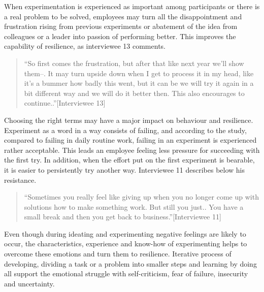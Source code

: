 When experimentation is experienced as important among participants or there is a real problem to be solved, employees may turn all the disappointment and frustration rising from previous experiments or abatement of the idea from colleagues or a leader into passion of performing better. This improves the capability of resilience, as interviewee 13 comments. 
\begin{quote}
``So first comes the frustration, but after that like next year we'll show them--. It may turn upside down when I get to process it in my head, like it's a bummer how badly this went, but it can be we will try it again in a bit different way and we will do it better then. This also encourages to continue..''[Interviewee 13]
\end{quote}
Choosing the right terms may have a major impact on behaviour and resilience. Experiment as a word in a way consists of failing, and according to the study, compared to failing in daily routine work, failing in an experiment is experienced rather acceptable. This leads an employee feeling less pressure for succeeding with the first try. In addition, when the effort put on the first experiment is bearable, it is easier to persistently try another way. Interviewee 11 describes below his resistance. 
\begin{quote}
``Sometimes you really feel like giving up when you no longer come up with solutions how to make something work. But still you just.. You have a small break and then you get back to business.''[Interviewee 11]
\end{quote}
Even though during ideating and experimenting negative feelings are likely to occur, the characteristics, experience and know-how of experimenting helps to overcome these emotions and turn them to resilience. Iterative process of developing, dividing a task or a problem into smaller steps and learning by doing all support the emotional struggle with self-criticism, fear of failure, insecurity and uncertainty. 
